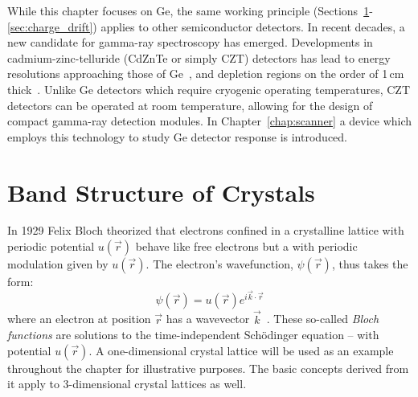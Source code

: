 While this chapter focuses on Ge, the same working principle (Sections~\ref{sec:band_structure}-\ref{sec:charge_drift}) applies to other semiconductor detectors. In recent decades, a new candidate for gamma-ray spectroscopy has emerged. Developments in cadmium-zinc-telluride (CdZnTe or simply CZT) detectors has lead to energy resolutions approaching those of Ge~\cite{delSordo2009}, and depletion regions on the order of 1\,cm thick~\cite{Wahl2015}. Unlike Ge detectors which require cryogenic operating temperatures, CZT detectors can be operated at room temperature, allowing for the design of compact gamma-ray detection modules. In Chapter~\ref{chap:scanner} a device which employs this technology to study Ge detector response is introduced.  


\section{Band Structure of Crystals}\label{sec:band_structure}
In 1929 Felix Bloch theorized that electrons confined in a crystalline lattice with periodic potential $u(\vec{r})$ behave like free electrons but a with periodic modulation given by $u(\vec{r})$. The electron's wavefunction, $\psi(\vec{r})$, thus takes the form:
\begin{equation}
	\psi(\vec{r}) = u(\vec{r})e^{i\vec{k} \cdot \vec{r}}
	\label{eq:bloch}
\end{equation}
where an electron at position $\vec{r}$ has a wavevector $\vec{k}$~\cite{bloch}. These so-called \textit{Bloch functions} are solutions to the time-independent Sch\"odinger equation -- with potential $u(\vec{r})$. A one-dimensional crystal lattice will be used as an example throughout the chapter for illustrative purposes. The basic concepts derived from it apply to 3-dimensional crystal lattices as well.

